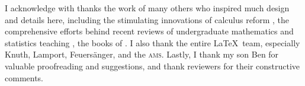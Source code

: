 I acknowledge with thanks the work of many others who inspired much design and details here, including 
the stimulating innovations of calculus reform \cite[e.g.,][]{HughesHallett2013},  
the comprehensive efforts behind recent reviews of  undergraduate mathematics and statistics teaching \cite[e.g.,][]{Alpers2013, Bressoud2014, Turner2014, StatsEduGuidelines2014, CUPMguide2015, gaimme2016}, 
the books of \cite{Anton6, Davis99a, Holt2013, Larson2013, Lay2012, Nakos1998, Poole2015, Will04}.
I also thank the entire \LaTeX\ team, especially Knuth, Lamport, Feuers\"anger, and the \textsc{ams}.
Lastly, I thank my son Ben for valuable proofreading and suggestions, and thank reviewers for their constructive comments. 







